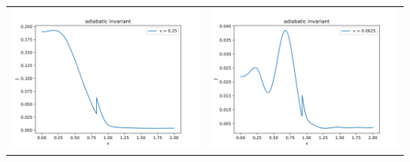 \documentclass[a4paper,zihao=5,UTF8]{ctexart}
\begin{document}
     \begin{table}[htbp]
        \centering
        \begin{tabular}[htbp]{cc}
            \includegraphics[scale=0.5]{2_ad_invr_v=0_25.png} & \includegraphics[scale=0.5]{2_ad_invr_v=0_0625.png} \\

\end{tabular}
\end{table}
\end{document}
